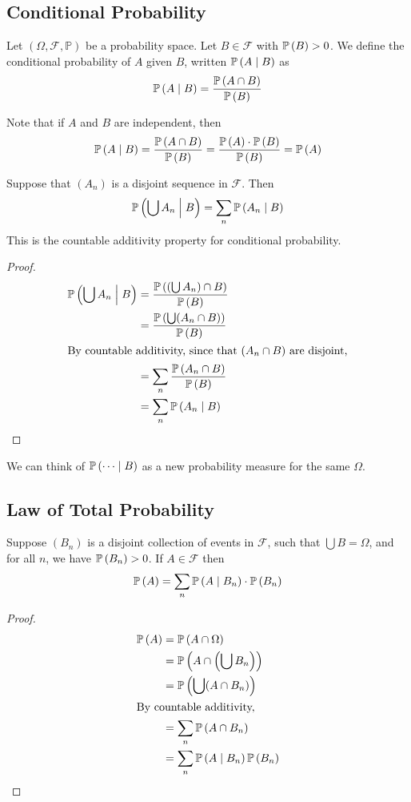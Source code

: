 \documentclass{article}
\begin{document}
\subsection{Conditional Probability}
\begin{definition}
	Let $(\Omega, \mathcal F, \mathbb P)$ be a probability space. Let $B \in \mathcal F$ with $\mathbb{P}\left({B}\right) > 0$. We define the conditional probability of $A$ given $B$, written $\mathbb{P}\left({A \mid B}\right)$ as
	\[ \mathbb{P}\left({A \mid B}\right) = \frac{\mathbb{P}\left({A \cap B}\right)}{\mathbb{P}\left({B}\right)} \]
\end{definition}
\noindent Note that if $A$ and $B$ are independent, then
\[ \mathbb{P}\left({A \mid B}\right) = \frac{\mathbb{P}\left({A \cap B}\right)}{\mathbb{P}\left({B}\right)} = \frac{\mathbb{P}\left({A}\right) \cdot \mathbb{P}\left({B}\right)}{\mathbb{P}\left({B}\right)} = \mathbb{P}\left({A}\right) \]
\begin{claim}
	Suppose that $(A_n)$ is a disjoint sequence in $\mathcal F$. Then
	\[ \mathbb{P}\left({\bigcup A_n \mathrel{\Big|} B}\right) = \sum_{n} \mathbb{P}\left({A_n \mid B}\right) \]
	This is the countable additivity property for conditional probability.
\end{claim}
\begin{proof}
	\begin{align*}
		\mathbb{P}\left({\bigcup A_n \mathrel{\Big|} B}\right) & = \frac{\mathbb{P}\left({(\bigcup A_n) \cap B}\right)}{\mathbb{P}\left({B}\right)} \\
		                                     & = \frac{\mathbb{P}\left({\bigcup (A_n \cap B)}\right)}{\mathbb{P}\left({B}\right)} \\
		\intertext{By countable additivity, since that $(A_n \cap B)$ are disjoint,}
		                                     & = \sum_n \frac{\mathbb{P}\left({A_n \cap B}\right)}{\mathbb{P}\left({B}\right)}    \\
		                                     & = \sum_n \mathbb{P}\left({A_n \mid B}\right)
	\end{align*}
\end{proof}
\noindent We can think of $\mathbb{P}\left({\dots \mid B}\right)$ as a new probability measure for the same $\Omega$.

\subsection{Law of Total Probability}
\begin{claim}
	Suppose $(B_n)$ is a disjoint collection of events in $\mathcal F$, such that $\bigcup B = \Omega$, and for all $n$, we have $\mathbb{P}\left({B_n}\right) > 0$. If $A \in \mathcal F$ then
	\[ \mathbb{P}\left({A}\right) = \sum_n \mathbb{P}\left({A \mid B_n}\right) \cdot \mathbb{P}\left({B_n}\right) \]
\end{claim}
\begin{proof}
	\begin{align*}
		\mathbb{P}\left({A}\right) & = \mathbb{P}\left({A \cap \Omega}\right)                   \\
		         & = \mathbb{P}\left({A \cap \left(\bigcup B_n\right)}\right) \\
		         & = \mathbb{P}\left({\bigcup(A \cap B_n)}\right)             \\
		\intertext{By countable additivity,}
		         & = \sum_n \mathbb{P}\left({A \cap B_n}\right)               \\
		         & = \sum_n \mathbb{P}\left({A \mid B_n}\right) \mathbb{P}\left({B_n}\right)
	\end{align*}
\end{proof}
\end{document}
